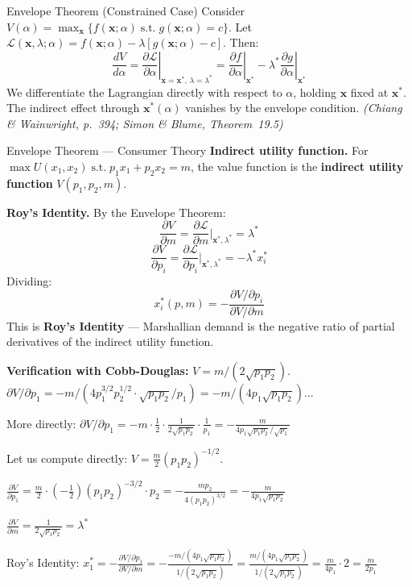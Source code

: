 \documentclass[12pt, a4paper]{article}
\theoremstyle{definition}
\newcommand{\bx}{\mathbf{x}}
\newcommand{\ddd}[2]{\dfrac{d#1}{d#2}}
\newcommand{\pp}[2]{\dfrac{\partial #1}{\partial #2}}
\newcommand{\st}{\;\text{s.t.}\;}
\begin{document}
\begin{thmbox}{Envelope Theorem (Constrained Case)}
Consider $V(\alpha) = \max_{\bx}\{f(\bx;\alpha) \st g(\bx;\alpha) = c\}$.
Let $\mathcal{L}(\bx,\lambda;\alpha) = f(\bx;\alpha) - \lambda[g(\bx;\alpha)-c]$.
Then:
\[
  \ddd{V}{\alpha}
  = \left.\pp{\mathcal{L}}{\alpha}\right|_{\bx=\bx^*,\,\lambda=\lambda^*}
  = \left.\pp{f}{\alpha}\right|_{\bx^*}
    - \lambda^*\left.\pp{g}{\alpha}\right|_{\bx^*}
\]
We differentiate the Lagrangian directly with respect to $\alpha$, holding
$\bx$ fixed at $\bx^*$. The indirect effect through $\bx^*(\alpha)$ vanishes
by the envelope condition.
\emph{(Chiang \& Wainwright, p.\ 394; Simon \& Blume, Theorem~19.5)}
\end{thmbox}

\begin{exbox}{Envelope Theorem --- Consumer Theory}
\textbf{Indirect utility function.}
For $\max U(x_1,x_2) \st p_1x_1+p_2x_2=m$, the value function is the
\textbf{indirect utility function} $V(p_1,p_2,m)$.

\textbf{Roy's Identity.}
By the Envelope Theorem:
\[
  \pp{V}{m} = \pp{\mathcal{L}}{m}\bigg|_{\bx^*,\lambda^*}
  = \lambda^*
\]
\[
  \pp{V}{p_i} = \pp{\mathcal{L}}{p_i}\bigg|_{\bx^*,\lambda^*}
  = -\lambda^* x_i^*
\]
Dividing:
\[
  x_i^*(p,m) = -\frac{\partial V/\partial p_i}{\partial V/\partial m}
\]
This is \textbf{Roy's Identity} --- Marshallian demand is the negative ratio
of partial derivatives of the indirect utility function.

\textbf{Verification with Cobb-Douglas:}
$V = m/(2\sqrt{p_1p_2})$.
$\partial V/\partial p_1 = -m/(4p_1^{3/2}p_2^{1/2}\cdot\sqrt{p_1p_2}/p_1)
= -m/(4p_1\sqrt{p_1p_2})$...

More directly: $\partial V/\partial p_1 = -m\cdot\frac{1}{2}\cdot\frac{1}{2\sqrt{p_1p_2}}\cdot\frac{1}{p_1}
= -\frac{m}{4p_1\sqrt{p_1p_2}/\sqrt{p_1}}$

Let us compute directly: $V = \frac{m}{2}(p_1p_2)^{-1/2}$.

$\frac{\partial V}{\partial p_1} = \frac{m}{2}\cdot(-\frac{1}{2})(p_1p_2)^{-3/2}\cdot p_2
= -\frac{mp_2}{4(p_1p_2)^{3/2}} = -\frac{m}{4p_1\sqrt{p_1p_2}}$

$\frac{\partial V}{\partial m} = \frac{1}{2\sqrt{p_1p_2}} = \lambda^*$ \checkmark

Roy's Identity:
$x_1^* = -\frac{\partial V/\partial p_1}{\partial V/\partial m}
= -\frac{-m/(4p_1\sqrt{p_1p_2})}{1/(2\sqrt{p_1p_2})}
= \frac{m/(4p_1\sqrt{p_1p_2})}{1/(2\sqrt{p_1p_2})}
= \frac{m}{4p_1}\cdot 2 = \frac{m}{2p_1}$ \checkmark
\end{exbox}
\end{document}
